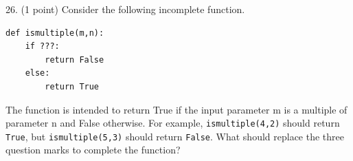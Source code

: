 \documentclass{article}
\newcounter{question}
\begin{document}
\noindent
\begin{minipage}{\textwidth}
26. (1 point)
Consider the following incomplete function.
\begin{verbatim}
def ismultiple(m,n):
    if ???:
        return False
    else:
        return True
\end{verbatim}
The function is intended to return True if the input parameter m is a multiple of parameter n and False otherwise. For example, \verb|ismultiple(4,2)| should return \verb|True|, but \verb|ismultiple(5,3)| should return \verb|False|. What should replace the three question marks to complete the function?

\end{minipage}
\vspace{2em}
\filbreak\vfil{}\vfilneg
\end{document}
